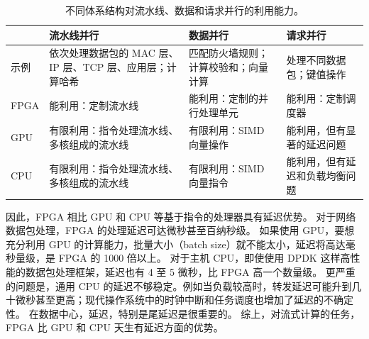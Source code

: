\begin{table}[htbp]
	\centering
	\caption{不同体系结构对流水线、数据和请求并行的利用能力。}
	\small
	\begin{tabular}{l|p{}|p{}|p{}}
		\hline
		& 流水线并行 & 数据并行 & 请求并行 \\
		\hline
		\hline
		示例 & 依次处理数据包的 MAC 层、IP 层、TCP 层、应用层；计算哈希 & 匹配防火墙规则；计算校验和；向量计算 & 处理不同数据包；键值操作 \\
		\hline
		FPGA & 能利用：定制流水线 & 能利用：定制的并行处理单元 & 能利用：定制调度器 \\
		\hline
		GPU & 有限利用：指令处理流水线、多核组成的流水线 & 有限利用：SIMD 向量操作 & 能利用，但有显著的延迟问题 \\
		\hline
		CPU & 有限利用：指令处理流水线、多核组成的流水线 & 有限利用：SIMD 向量指令 & 能利用，但有延迟和负载均衡问题 \\
		\hline
	\end{tabular}
	\label{background:tab:fpga-parallelism}
\end{table}


因此，FPGA 相比 GPU 和 CPU 等基于指令的处理器具有延迟优势。
对于网络数据包处理，FPGA 的处理延迟可达微秒甚至百纳秒级。
如果使用 GPU，要想充分利用 GPU 的计算能力，批量大小（batch size）就不能太小，延迟将高达毫秒量级，是 FPGA 的 1000 倍以上。
对于主机 CPU，即使使用 DPDK 这样高性能的数据包处理框架，延迟也有 4 至 5 微秒，比 FPGA 高一个数量级。
更严重的问题是，通用 CPU 的延迟不够稳定。例如当负载较高时，转发延迟可能升到几十微秒甚至更高；现代操作系统中的时钟中断和任务调度也增加了延迟的不确定性。
在数据中心，延迟，特别是尾延迟是很重要的。
综上，对流式计算的任务，FPGA 比 GPU 和 CPU 天生有延迟方面的优势。





